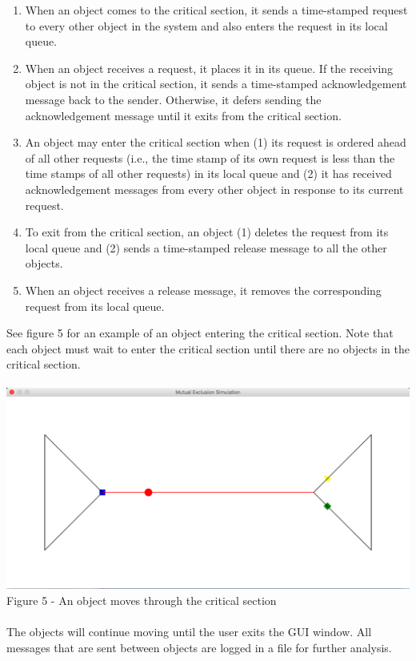 \documentclass [11pt] {article}
\begin{document}
	\begin {enumerate}
		\item When an object comes to the critical section, it sends a time-stamped request to every other object in the system and also enters the request in its local queue.
		\item When an object receives a request, it places it in its queue.  If the receiving object is not in the critical section, it sends a time-stamped acknowledgement message back to the sender.  Otherwise, it defers sending the acknowledgement message until it exits from the critical section.
		\item An object may enter the critical section when (1) its request is ordered ahead of all other requests (i.e., the time stamp of its own request is less than the time stamps of all other requests) in its local queue and (2) it has received acknowledgement messages from every other object in response to its current request.
		\item To exit from the critical section, an object (1) deletes the request from its local queue and (2) sends a time-stamped release message to all the other objects.
		\item When an object receives a release message, it removes the corresponding request from its local queue.
	\end {enumerate}
	See figure 5 for an example of an object entering the critical section.  Note that each object must wait to enter the critical section until there are no objects in the critical section.\\\\ \includegraphics [scale = .5] {Figure5}\\ Figure 5 - An object moves through the critical section\\\\  The objects will continue moving until the user exits the GUI window.  All messages that are sent between objects are logged in a file for further analysis.  
\end{document}
